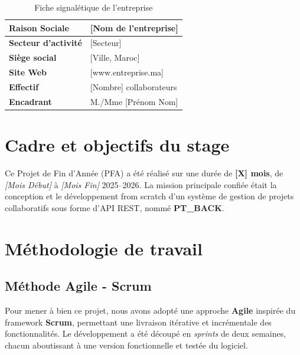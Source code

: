 \vspace{0.5cm}
\begin{table}[H]
\centering
\caption{Fiche signal\'{e}tique de l'entreprise}
\begin{tabular}{|>{\bfseries\color{emsiDark}}l|l|}
\hline
\rowcolor{emsiRed!15}
Raison Sociale     & [Nom de l'entreprise] \\
\hline
Secteur d'activit\'{e} & [Secteur] \\
\hline
Si\`{e}ge social       & [Ville, Maroc] \\
\hline
Site Web           & [www.entreprise.ma] \\
\hline
Effectif           & [Nombre] collaborateurs \\
\hline
Encadrant          & M./Mme [Pr\'{e}nom Nom] \\
\hline
\end{tabular}
\end{table}

\section{Cadre et objectifs du stage}

Ce Projet de Fin d'Ann\'{e}e (PFA) a \'{e}t\'{e} r\'{e}alis\'{e} sur une dur\'{e}e de \textbf{[X] mois},
de \textit{[Mois D\'{e}but]} \`{a} \textit{[Mois Fin]} 2025--2026. La mission principale
confi\'{e}e \'{e}tait la conception et le d\'{e}veloppement from scratch d'un syst\`{e}me de
gestion de projets collaboratifs sous forme d'API REST, nomm\'{e} \textbf{PT\_BACK}.

\section{M\'{e}thodologie de travail}

\subsection{M\'{e}thode Agile - Scrum}

Pour mener \`{a} bien ce projet, nous avons adopt\'{e} une approche \textbf{Agile} inspir\'{e}e du
framework \textbf{Scrum}, permettant une livraison it\'{e}rative et incr\'{e}mentale des fonctionnalit\'{e}s.
Le d\'{e}veloppement a \'{e}t\'{e} d\'{e}coup\'{e} en \textit{sprints} de deux semaines, chacun aboutissant
\`{a} une version fonctionnelle et test\'{e}e du logiciel.

